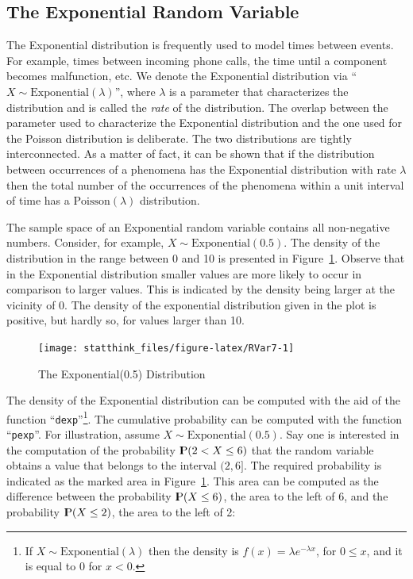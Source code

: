\documentclass[]{krantz}
\newcommand{\Prob}{{\rm I\kern-.3em P}}
\theoremstyle{definition}
\theoremstyle{definition}
\theoremstyle{definition}
\theoremstyle{remark}
\begin{document}
\hypertarget{the-exponential-random-variable}{%
\subsection{The Exponential Random Variable}\label{the-exponential-random-variable}}

The Exponential distribution is frequently used to model times between
events. For example, times between incoming phone calls, the time until
a component becomes malfunction, etc. We denote the Exponential
distribution via ``\(X \sim \mathrm{Exponential}(\lambda)\)'', where
\(\lambda\) is a parameter that characterizes the distribution and is
called the \emph{rate} of the distribution. The overlap between the parameter
used to characterize the Exponential distribution and the one used for
the Poisson distribution is deliberate. The two distributions are
tightly interconnected. As a matter of fact, it can be shown that if the
distribution between occurrences of a phenomena has the Exponential
distribution with rate \(\lambda\) then the total number of the
occurrences of the phenomena within a unit interval of time has a
\(\mathrm{Poisson}(\lambda)\) distribution.

The sample space of an Exponential random variable contains all
non-negative numbers. Consider, for example,
\(X \sim \mathrm{Exponential}(0.5)\). The density of the distribution in
the range between 0 and 10 is presented in Figure~\ref{fig:RVar7}.
Observe that in the Exponential distribution smaller values are more
likely to occur in comparison to larger values. This is indicated by the
density being larger at the vicinity of 0. The density of the
exponential distribution given in the plot is positive, but hardly so,
for values larger than 10.

\begin{figure}

{\centering \texttt{[image: statthink\_files/figure-latex/RVar7-1]} 

}

\caption{The Exponential(0.5) Distribution}\label{fig:RVar7}
\end{figure}

The density of the Exponential distribution can be computed with the aid
of the function ``\texttt{dexp}''\footnote{If \(X \sim \mathrm{Exponential}(\lambda)\) then the density
  is \(f(x) =\lambda e^{-\lambda x}\), for \(0 \leq x\), and it is equal
  to 0 for \(x < 0\).}. The cumulative probability can be computed
with the function ``\texttt{pexp}''. For illustration, assume
\(X \sim \mathrm{Exponential}(0.5)\). Say one is interested in the
computation of the probability \(\Prob(2 < X \leq 6)\) that the random
variable obtains a value that belongs to the interval \((2,6]\). The
required probability is indicated as the marked area in
Figure~\ref{fig:RVar7}. This area can be computed as the difference
between the probability \(\Prob(X \leq 6)\), the area to the left of 6,
and the probability \(\Prob(X \leq 2)\), the area to the left of 2:
\end{document}
